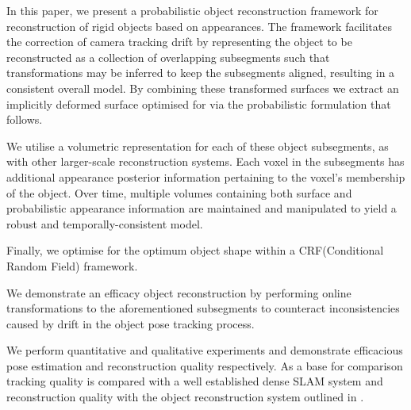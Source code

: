 In this paper, we present a probabilistic object reconstruction framework for reconstruction of rigid objects based on 
appearances. The framework facilitates the correction of camera tracking drift by representing the object to be reconstructed as a
collection of overlapping subsegments such that transformations may be inferred to keep the subsegments aligned, resulting in a consistent
overall model. By combining these transformed surfaces we extract an implicitly deformed surface optimised for via the probabilistic formulation 
that follows.

We utilise a volumetric representation for each of these object subsegments, as with other larger-scale reconstruction
systems\cite{Kahler2016}. Each voxel in the subsegments has additional appearance posterior information pertaining to the voxel's membership 
of the object. Over time, multiple volumes containing both surface and probabilistic appearance information are maintained and manipulated to 
yield a robust and temporally-consistent model.

Finally, we optimise for the optimum object shape within a CRF(Conditional Random Field) framework.

We demonstrate an efficacy object reconstruction by performing online transformations to the aforementioned subsegments to counteract inconsistencies caused by drift in the object pose tracking process.

We perform quantitative and qualitative experiments and demonstrate efficacious pose estimation and reconstruction quality respectively. As a base 
for comparison tracking quality is compared with a well established dense SLAM system \cite{Prisacariu2014} and reconstruction quality with the 
object reconstruction system outlined in \cite{Ren2013}.